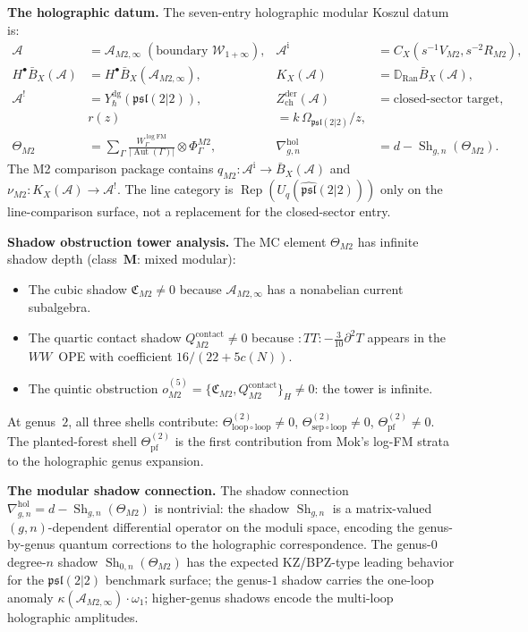 \documentclass[11pt]{report}
\theoremstyle{definition}
\theoremstyle{remark}
\providecommand{\cA}{\mathcal{A}}
\providecommand{\barB}{\bar{B}}
\providecommand{\Ran}{\mathrm{Ran}}
\numberwithin{equation}{section}
\begin{document}
\medskip
\noindent\textbf{The holographic datum.}
The seven-entry holographic modular Koszul datum is:
\begin{align*}
\cA &= \cA_{M2,\infty}\;(\text{boundary }\mathcal W_{1+\infty}),
&\cA^{\mathrm i} &= C_X(s^{-1}V_{M2},s^{-2}R_{M2}),\\[3pt]
H^\bullet\barB_X(\cA)&=H^\bullet\barB_X(\cA_{M2,\infty}),
&K_X(\cA)&=\mathbb D_{\Ran}\barB_X(\cA),\\[3pt]
\cA^! &= Y^{\mathrm{dg}}_\hbar(\mathfrak{psl}(2|2)),
&Z^{\mathrm{der}}_{\mathrm{ch}}(\cA) &= \text{closed-sector target},\\[3pt]
&r(z) &= k\,\Omega_{\mathfrak{psl}(2|2)}/z,\\[3pt]
\Theta_{M2} &= \sum_\Gamma
 \frac{W^{\log\mathrm{FM}}_\Gamma}{|\operatorname{Aut}(\Gamma)|}
 \otimes\Phi^{M2}_\Gamma,
&\nabla^{\mathrm{hol}}_{g,n} &= d-\operatorname{Sh}_{g,n}(\Theta_{M2}).
\end{align*}
The M2 comparison package contains
$q_{M2}\colon\cA^{\mathrm i}\to\barB_X(\cA)$ and
$\nu_{M2}\colon K_X(\cA)\to\cA^!$.
The line category is
\(\operatorname{Rep}(U_q(\widehat{\mathfrak{psl}}(2|2)))\) only on
the line-comparison surface, not a replacement for the closed-sector
entry.

\medskip
\noindent\textbf{Shadow obstruction tower analysis.}
The MC element $\Theta_{M2}$ has infinite shadow depth
(class~$\mathbf M$: mixed modular):
\begin{itemize}[nosep]
\item The cubic shadow $\mathfrak C_{M2}\neq 0$ because
 $\cA_{M2,\infty}$ has a nonabelian current subalgebra.
\item The quartic contact shadow
 $Q^{\mathrm{contact}}_{M2}\neq 0$ because
 ${:}TT{:}-\frac{3}{10}\partial^2 T$ appears in the $WW$~OPE
 with coefficient $16/(22+5c(N))$.
\item The quintic obstruction
 $o^{(5)}_{M2}=\{\mathfrak C_{M2},Q^{\mathrm{contact}}_{M2}\}_H
 \neq 0$: the tower is infinite.
\end{itemize}
At genus~$2$, all three shells contribute:
$\Theta^{(2)}_{\mathrm{loop}\circ\mathrm{loop}}\neq 0$,
$\Theta^{(2)}_{\mathrm{sep}\circ\mathrm{loop}}\neq 0$,
$\Theta^{(2)}_{\mathrm{pf}}\neq 0$. The planted-forest shell
$\Theta^{(2)}_{\mathrm{pf}}$ is the first contribution from Mok's
log-FM strata to the holographic genus expansion.

\medskip
\noindent\textbf{The modular shadow connection.}
The shadow connection
$\nabla^{\mathrm{hol}}_{g,n}=d-\operatorname{Sh}_{g,n}(\Theta_{M2})$
is nontrivial: the shadow $\operatorname{Sh}_{g,n}$ is a
matrix-valued $(g,n)$-dependent differential operator on the
moduli space, encoding the genus-by-genus quantum corrections to
the holographic correspondence. The genus-$0$ degree-$n$ shadow
$\operatorname{Sh}_{0,n}(\Theta_{M2})$ has the expected
KZ/BPZ-type leading behavior for the $\mathfrak{psl}(2|2)$
benchmark surface; the genus-$1$ shadow
carries the one-loop anomaly $\kappa(\cA_{M2,\infty})\cdot\omega_1$;
higher-genus shadows encode the multi-loop holographic amplitudes.
\end{document}

